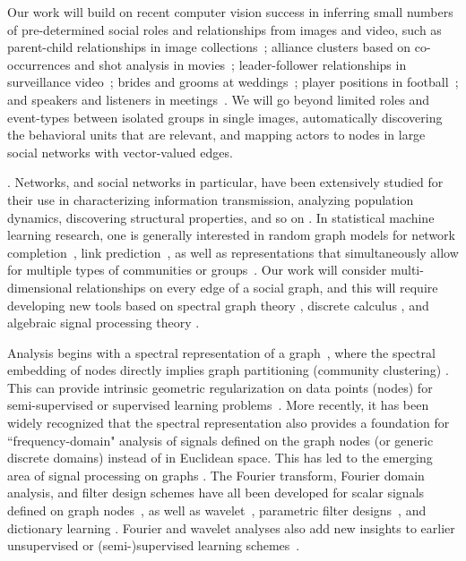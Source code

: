 Our work will build on recent computer vision success in inferring small numbers of pre-determined social roles and relationships from images and video, such as parent-child relationships in image collections~\cite{Gallagher,Wang2010,Murillo2012}; alliance clusters based on co-occurrences and shot analysis in movies~\cite{Ding2010,Ding2011}; leader-follower relationships in surveillance video~\cite{Yu2009,Zhang2011}; brides and grooms at weddings~\cite{FeiFeiRole2013}; player positions in football~\cite{LanSM12}; and speakers and listeners in meetings~\cite{meetingrolerecognition}. We will go beyond limited roles and event-types between isolated groups in single images, automatically discovering the behavioral units that are relevant, and mapping actors to nodes in large social networks with vector-valued edges.


. Networks, and social networks in particular, have been extensively studied for their use in characterizing information transmission, analyzing population dynamics, discovering structural properties, and so on \cite{Jackson:2008,David:2010}. In statistical machine learning research, one is generally interested in random graph models for network completion~\cite{Clauset,Guimera,HannekeX09,KimL11}, link prediction~\cite{Goldberg,Liben-Nowell,TaskarWAK03}, as well as representations that simultaneously allow for multiple types of communities or groups~\cite{AiroldiBFX08,Kim12}. Our work will consider multi-dimensional relationships on every edge of a social graph, and this will require developing new tools based on spectral graph theory \cite{SpectralChung}, discrete calculus \cite{Grady10}, and algebraic signal processing theory \cite{ASP}.

Analysis begins with a spectral representation of a graph~\cite{Ng:spectral,Luxburg,zhang2008multiway}, where the spectral embedding of nodes directly implies graph partitioning (community clustering) \cite{PhysRevE,Boykov:segmentation}. This can provide intrinsic geometric regularization on data points (nodes) for semi-supervised or supervised learning problems~\cite{Zhu2005,Smola2003,Zhou04}. More recently, it has been widely recognized that the spectral representation also provides a foundation for ``frequency-domain" analysis of signals defined on the graph nodes (or generic discrete domains) instead of in Euclidean space. This has led to the emerging area of signal processing on graphs \cite{MouraSurvey,ShumanSurvey}. The Fourier transform, Fourier domain analysis, and filter design schemes have all been developed for scalar signals defined on graph nodes~\cite{hammond,Agaskar,Rabbat,shuman_ACHA_2013}, as well as wavelet~\cite{CK03,GavishNC10,narang2009lifting,RamEladCohen,NIPS2013_5046,Leonardi,ShumanFV13}, parametric filter designs~\cite{SandryhailaFilter,hammond}, and dictionary learning \cite{ThanouSF14,ZhangDF12}. Fourier and wavelet analyses also add new insights to earlier unsupervised \cite{Tremblay2014} or (semi-)supervised learning schemes~\cite{shuman2011semi,narang2013localized,Ekambaram,sandryhaila2013classification,ChenTSP2014}.

